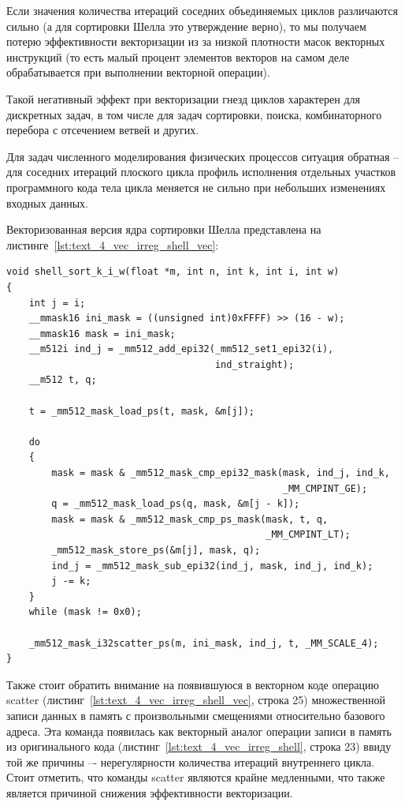 Если значения количества итераций соседних объединяемых циклов различаются сильно (а для сортировки Шелла это утверждение верно), то мы получаем потерю эффективности векторизации из за низкой плотности масок\label{term:vector_mask_density5} векторных инструкций (то есть малый процент элементов векторов на самом деле обрабатывается при выполнении векторной операции).

Такой негативный эффект при векторизации гнезд циклов характерен для дискретных задач, в том числе для задач сортировки, поиска, комбинаторного перебора с отсечением ветвей и других.

Для задач численного моделирования физических процессов ситуация обратная -- для соседних итераций плоского цикла профиль исполнения\label{term:execution_profile3} отдельных участков программного кода тела цикла меняется не сильно при небольших изменениях входных данных.

Векторизованная версия ядра сортировки Шелла представлена на листинге~\ref{lst:text_4_vec_irreg_shell_vec}:

\begin{lstlisting}[caption={Векторизованный вариант ядра сортировки Шелла.},label={lst:text_4_vec_irreg_shell_vec}]
void shell_sort_k_i_w(float *m, int n, int k, int i, int w)
{
    int j = i;
    __mmask16 ini_mask = ((unsigned int)0xFFFF) >> (16 - w);
    __mmask16 mask = ini_mask;
    __m512i ind_j = _mm512_add_epi32(_mm512_set1_epi32(i),
                                     ind_straight);
    __m512 t, q;

    t = _mm512_mask_load_ps(t, mask, &m[j]);

    do
    {
        mask = mask & _mm512_mask_cmp_epi32_mask(mask, ind_j, ind_k,
                                                 _MM_CMPINT_GE);
        q = _mm512_mask_load_ps(q, mask, &m[j - k]);
        mask = mask & _mm512_mask_cmp_ps_mask(mask, t, q,
                                              _MM_CMPINT_LT);
        _mm512_mask_store_ps(&m[j], mask, q);
        ind_j = _mm512_mask_sub_epi32(ind_j, mask, ind_j, ind_k);
        j -= k;
    }
    while (mask != 0x0);

    _mm512_mask_i32scatter_ps(m, ini_mask, ind_j, t, _MM_SCALE_4);
}
\end{lstlisting}

Также стоит обратить внимание на появившуюся в векторном коде операцию scatter (листинг~\ref{lst:text_4_vec_irreg_shell_vec}, строка 25) множественной записи данных в память с произвольными смещениями относительно базового адреса.
Эта команда появилась как векторный аналог операции записи в память из оригинального кода (листинг~\ref{lst:text_4_vec_irreg_shell}, строка 23) ввиду той же причины –- нерегулярности количества итераций внутреннего цикла.
Стоит отметить, что команды scatter являются крайне медленными, что также является причиной снижения эффективности векторизации.

